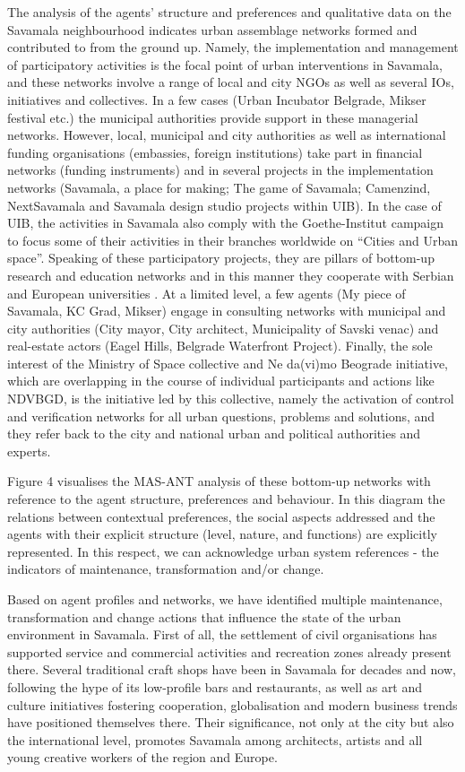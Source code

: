 \documentclass[11pt]{report}
\begin{document}
The analysis of the agents’ structure and preferences and qualitative data on the Savamala neighbourhood indicates urban assemblage networks formed and contributed to from the ground up. Namely, the implementation and management of participatory activities is the focal point of urban interventions in Savamala, and these networks involve a range of local and city NGOs as well as several IOs, initiatives and collectives. In a few cases (Urban Incubator Belgrade, Mikser festival etc.) the municipal authorities provide support in these managerial networks. However, local, municipal and city authorities as well as international funding organisations (embassies, foreign institutions) take part in financial networks (funding instruments) and in several projects in the implementation networks (Savamala, a place for making; The game of Savamala; Camenzind, NextSavamala and Savamala design studio projects within UIB). In the case of UIB, the activities in Savamala also comply with the Goethe-Institut campaign to focus some of their activities in their branches worldwide on “Cities and Urban space”. Speaking of these participatory projects, they are pillars of bottom-up research and education networks and in this manner they cooperate with Serbian and European universities . At a limited level, a few agents (My piece of Savamala, KC Grad, Mikser) engage in consulting networks with municipal and city authorities (City mayor, City architect, Municipality of Savski venac) and real-estate actors (Eagel Hills, Belgrade Waterfront Project). Finally, the sole interest of the Ministry of Space collective and Ne da(vi)mo Beograde initiative, which are overlapping in the course of individual participants and actions like NDVBGD, is the initiative led by this collective, namely the activation of control and verification networks for all urban questions, problems and solutions, and they refer back to the city and national urban and political authorities and experts.

Figure 4 visualises the MAS-ANT analysis of these bottom-up networks with reference to the agent structure, preferences and behaviour. In this diagram the relations between contextual preferences, the social aspects addressed and the agents with their explicit structure (level, nature, and functions) are explicitly represented. In this respect, we can acknowledge urban system references - the indicators of maintenance, transformation and/or change.

Based on agent profiles and networks, we have identified multiple maintenance, transformation and change actions that influence the state of the urban environment in Savamala. First of all, the settlement of civil organisations has supported service and commercial activities and recreation zones already present there. Several traditional craft shops have been in Savamala for decades and now, following the hype of its low-profile bars and restaurants, as well as art and culture initiatives fostering cooperation, globalisation and modern business trends have positioned themselves there. Their significance, not only at the city but also the international level, promotes Savamala among architects, artists and all young creative workers of the region and Europe.
\end{document}
